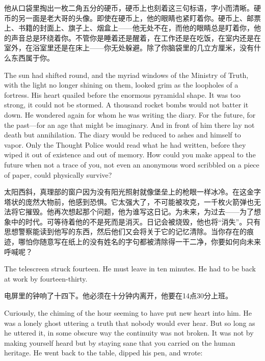 \begin{paracol}{2}
他从口袋里掏出一枚二角五分的硬币，硬币上也刻着这三句标语，字小而清晰。硬币的另一面是老大哥的头像。即使在硬币上，他的眼睛也紧盯着你。硬币上、邮票上、书籍的封面上、旗子上、烟盒上——他无处不在，而他的眼睛总是盯着你，他的声音总是环绕着你。不管你是睡着还是醒着，在工作还是在吃饭，在室内还是在室外，在浴室里还是在床上——你无处躲避。除了你脑袋里的几立方厘米，没有什么东西属于你。

\switchcolumn*

The sun had shifted round, and the myriad windows of the Ministry of
Truth, with the light no longer shining on them, looked grim as the
loopholes of a fortress. His heart quailed before the enormous pyramidal
shape. It was too strong, it could not be stormed. A thousand rocket
bombs would not batter it down. He wondered again for whom he was
writing the diary. For the future, for the past---for an age that might
be imaginary. And in front of him there lay not death but annihilation.
The diary would be reduced to ashes and himself to vapor. Only the
Thought Police would read what he had written, before they wiped it out
of existence and out of memory. How could you make appeal to the future
when not a trace of you, not even an anonymous word scribbled on a piece
of paper, could physically survive?

\switchcolumn

太阳西斜，真理部的窗户因为没有阳光照射就像堡垒上的枪眼一样冰冷。在这金字塔状的庞然大物前，他感到恐惧。它太强大了，不可能被攻克，一千枚火箭弹也无法将它摧毁。他再次想起那个问题，他为谁写这日记。为未来，为过去——为了想象中的时代。可等待着他的不是死而是消灭。日记会被烧毁，他也将``消失''。只有思想警察能读到他写的东西，然后他们又会将关于它的记忆清除。当你存在的痕迹，哪怕你随意写在纸上的没有姓名的字句都被清除得一干二净，你要如何向未来呼喊呢？

\switchcolumn*

The telescreen struck fourteen. He must leave in ten minutes. He had to
be back at work by fourteen-thirty.

\switchcolumn

电屏里的钟响了十四下。他必须在十分钟内离开，他要在14点30分上班。

\switchcolumn*

Curiously, the chiming of the hour seeming to have put new heart into
him. He was a lonely ghost uttering a truth that nobody would ever hear.
But so long as he uttered it, in some obscure way the continuity was not
broken. It was not by making yourself heard but by staying sane that you
carried on the human heritage. He went back to the table, dipped his
pen, and wrote:


\end{paracol}
